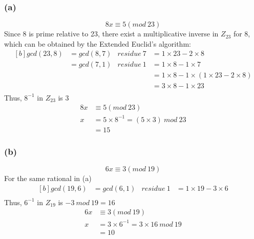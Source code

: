 \documentclass[11pt]{article}
\begin{document}
\subsubsection*{(a)}
$$8x\equiv 5(mod\ 23)$$
Since 8 is prime relative to 23, there exist a multiplicative inverse in $Z_{23}$ for $8$, which can be obtained by the Extended Euclid's algorithm:
\begin{equation}
\begin{aligned}[b]
gcd(23,8)	&=gcd(8,7)	&residue\ 7	&= 1\times 23-2\times 8\\
			&=gcd(7,1)	&residue\ 1	&= 1\times 8 -1\times 7\\
			&			&		   	&= 1\times 8 -1\times (1\times 23-2\times 8)\\
			&			&			&= 3\times 8 -1\times 23\\
\end{aligned}
\end{equation}
Thus, $8^{-1}$ in $Z_{23}$ is 3
\begin{equation}
\begin{split}
8x&\equiv 5(mod\ 23)\\
x&= 5\times 8^{-1}=(5\times 3)\ mod\ 23\\
&=15
\end{split}
\end{equation}
\pagebreak
\subsubsection*{(b)}
$$6x\equiv 3(mod\ 19)$$
For the same rational in (a)\\
\begin{equation}
\begin{aligned}[b]
gcd(19,6)	&=gcd(6,1)	&residue\ 1	&= 1\times 19-3\times 6\\
\end{aligned}
\end{equation}
Thus, $6^{-1}$ in $Z_{19}$ is $-3\ mod\ 19=16$
\begin{equation}
\begin{split}
6x&\equiv 3(mod\ 19)\\
x&=3\times 6^{-1}=3\times 16\ mod\ 19\\
&=10
\end{split}
\end{equation}
	
\end{document}
